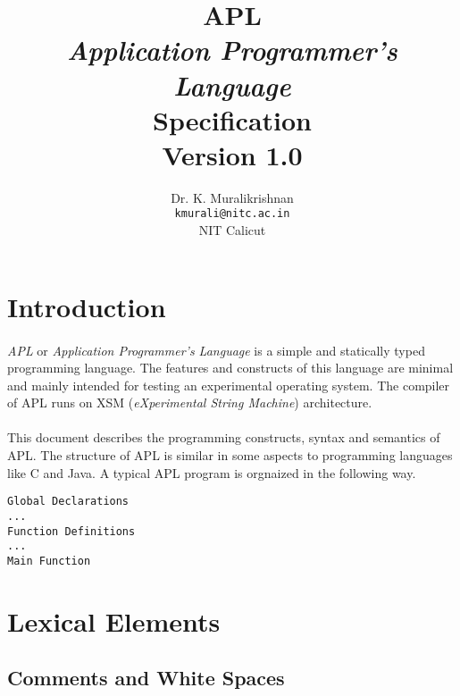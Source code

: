 \documentclass[11pt]{article}
\title{APL \\ \textit{Application Programmer's Language} \\ Specification \\ Version 1.0}
\author{Dr. K. Muralikrishnan  \\ \texttt{kmurali@nitc.ac.in} \\ {NIT Calicut} }
\begin{document}
 \newcommand{\kw}[1]{\texttt{#1}}

\maketitle

\pagebreak
\thispagestyle{plain}

\tableofcontents
\pagebreak


\section{Introduction}
\paragraph{}

\textit{APL} or \textit{Application Programmer’s Language} is a simple and statically typed programming language. The features and constructs of this language are minimal and mainly intended for testing an experimental operating system. The compiler of APL runs on XSM (\textit{eXperimental String Machine}) architecture. 


\paragraph{}
This document describes the programming constructs, syntax and semantics of APL. The structure of APL is similar in some aspects to programming languages like C and Java. A typical APL program is orgnaized in the following way.

\begin{verbatim}
Global Declarations
...
Function Definitions
...
Main Function
\end{verbatim}


\section{Lexical Elements}




\subsection{Comments and White Spaces}
\end{document}
